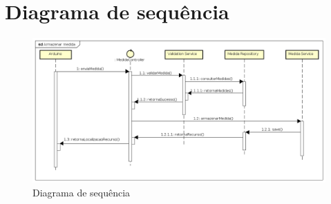 \chapter{Diagrama de sequência}

\begin{figure}[H]
    \label{figure_diagrama_sequencia}
    \centering
    \caption{Diagrama de sequência}
    \label{includegraphics_diagrama_sequencia}
    \includegraphics[scale=0.46]{diagrams/sequencia.png}
    \hfill
\end{figure}
